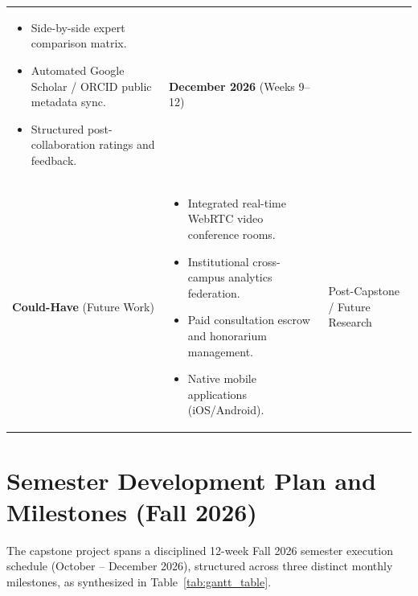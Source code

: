 \documentclass[11pt,a4paper]{article}
\begin{document}
\begin{table}[H]
\begin{tabularx}{\textwidth}{@{}p{2.8cm} X p{3.2cm}@{}}
\begin{itemize}[leftmargin=*,noitemsep]
    \item Side-by-side expert comparison matrix.
    \item Automated Google Scholar / ORCID public metadata sync.
    \item Structured post-collaboration ratings and feedback.
\end{itemize} & \textbf{December 2026} \newline (Weeks 9--12) \\
\addlinespace
\textbf{Could-Have} \newline (Future Work) & 
\begin{itemize}[leftmargin=*,noitemsep]
    \item Integrated real-time WebRTC video conference rooms.
    \item Institutional cross-campus analytics federation.
    \item Paid consultation escrow and honorarium management.
    \item Native mobile applications (iOS/Android).
\end{itemize} & Post-Capstone / Future Research \\
\bottomrule
\end{tabularx}
\end{table}

\clearpage
\section[Semester Plan \& Timeline]{Semester Development Plan and Milestones (Fall 2026)}

The capstone project spans a disciplined 12-week Fall 2026 semester execution schedule (October -- December 2026), structured across three distinct monthly milestones, as synthesized in Table~\ref{tab:gantt_table}.
\end{document}
